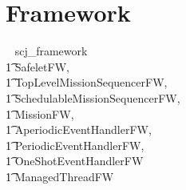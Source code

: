 \section{Framework}
\vspace{-0.75em}

\begin{zsection}
  \SECTION ~ scj\_framework ~ \parents\\
  \t1 SafeletFW,\\
  \t1 TopLevelMissionSequencerFW,\\
  \t1 SchedulableMissionSequencerFW, \\
  \t1 MissionFW,\\
  \t1 AperiodicEventHandlerFW,\\
  \t1 PeriodicEventHandlerFW, \\
  \t1 OneShotEventHandlerFW \\
  \t1 ManagedThreadFW
\end{zsection}
